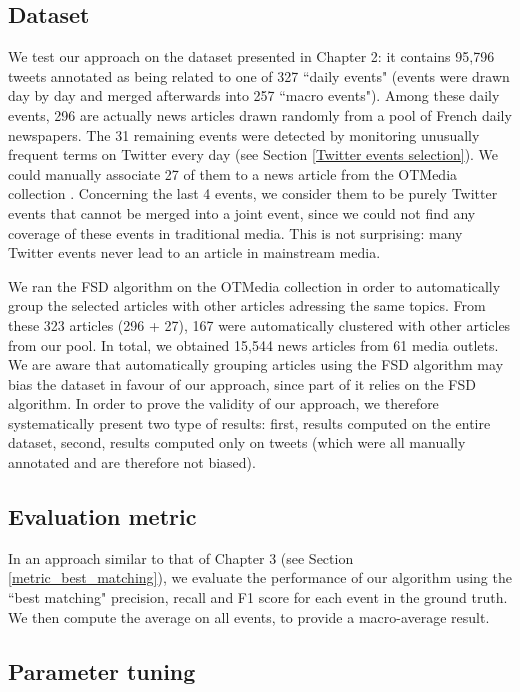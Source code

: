 \subsection{Dataset}
We test our approach on the dataset presented in Chapter 2: it contains 95,796 tweets annotated as being related to one of 327 ``daily events" (events were drawn day by day and merged afterwards into 257 ``macro events"). Among these daily events, 296 are actually news articles drawn randomly from a pool of French daily newspapers. The 31 remaining events were detected by monitoring unusually frequent terms on Twitter every day (see Section \ref{Twitter events selection}). We could manually associate 27 of them to a news article from the OTMedia collection \citep{herve2019otmedia}. Concerning the last 4 events, we consider them to be purely Twitter events that cannot be merged into a joint event, since we could not find any coverage of these events in traditional media. This is not surprising: many Twitter events never lead to an article in mainstream media.

We ran the FSD algorithm on the OTMedia collection in order to automatically group the selected articles with other articles adressing the same topics. From these 323 articles (296 + 27), 167 were automatically clustered with other articles from our pool. In total, we obtained 15,544 news articles from 61 media outlets. We are aware that automatically grouping articles using the FSD algorithm may bias the dataset in favour of our approach, since part of it relies on the FSD algorithm. In order to prove the validity of our approach, we therefore systematically present two type of results: first, results computed on the entire dataset, second, results computed only on tweets (which were all manually annotated and are therefore not biased).

\subsection{Evaluation metric}
In an approach similar to that of Chapter 3 (see Section \ref{metric_best_matching}), we evaluate the performance of our algorithm using the ``best matching" precision, recall and F1 score \citep{yang1998study} for each event in the ground truth. We then compute the average on all events, to provide a macro-average result.

\subsection{Parameter tuning}

